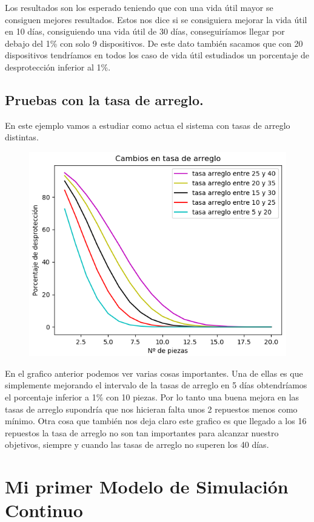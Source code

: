 \documentclass[]{article}
\begin{document}
Los resultados son los esperado teniendo que con una vida útil mayor se consiguen mejores resultados. Estos nos dice si se consiguiera mejorar la vida útil en 10 días, consiguiendo una vida útil de 30 días, conseguiríamos llegar por debajo del 1\% con solo 9 dispositivos. De este dato también sacamos que con 20 dispositivos tendríamos en todos los caso de vida útil estudiados un porcentaje de desprotección inferior al 1\%.

\subsection{Pruebas con la tasa de arreglo.}
En este ejemplo vamos a estudiar como actua el sistema con tasas de arreglo distintas. 
\begin{figure}[H]
	\centering
	\includegraphics[width=1\linewidth]{img/screenshot0019}
	\caption{}
	\label{fig:screenshot0019}
\end{figure}

En el grafico anterior podemos ver varias cosas importantes. Una de ellas es que simplemente mejorando el intervalo de la tasas de arreglo en 5 días obtendríamos el porcentaje inferior a 1\% con 10 piezas. Por lo tanto una buena mejora en las tasas de arreglo supondría que nos hicieran falta unos 2 repuestos menos como mínimo. Otra cosa que también nos deja claro este grafico es que llegado a los 16 repuestos la tasa de arreglo no son tan importantes para alcanzar nuestro objetivos, siempre y cuando las tasas de arreglo no superen los 40 días.

\section{Mi primer Modelo de Simulación Continuo}
\end{document}

